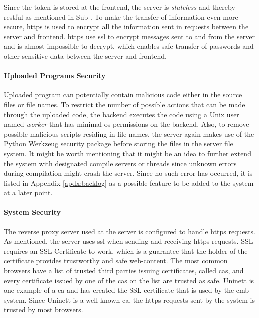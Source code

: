 Since the token is stored at the frontend, the server is \textit{stateless} and thereby \gls{rest}ful as mentioned in Sub-. To make the transfer of information even more secure, \gls{https} is used to encrypt all the information sent in requests between the server and frontend. \gls{https} use \gls{ssl} to encrypt messages sent to and from the server and is almost impossible to decrypt, which enables safe transfer of passwords and other sensitive data between the server and frontend.

\paragraph*{Uploaded Programs Security} Uploaded program can potentially contain malicious code either in the source files or file names. To restrict the number of possible actions that can be made through the uploaded code, the backend executes the code using a Unix user named \textit{worker} that has minimal \gls{os} permissions on the backend. Also, to remove possible malicious scripts residing in file names, the server again makes use of the Python Werkzeug security package \cite{WERKZEUG} before storing the files in the server file system. It might be worth mentioning that it might be an idea to further extend the system with designated compile servers or threads since unknown errors during compilation might crash the server. Since no such error has occurred, it is listed in Appendix \ref{apdx:backlog} as a possible feature to be added to the system at a later point.

\paragraph*{System Security} The reverse proxy server used at the server is configured to handle \gls{https} requests. As mentioned, the server uses \gls{ssl} when sending and receiving \gls{https} requests. SSL requires an SSL Certificate to work, which is a guarantee that the holder of the certificate provides trustworthy and safe web-content. The most common browsers have a list of trusted third parties issuing certificates, called \glspl{ca}, and every certificate issued by one of the \glspl{ca} on the list are trusted as safe. Uninett is one example of a \gls{ca} and has created the SSL certificate that is used by the \gls{cmb} system. Since Uninett is a well known \gls{ca}, the \gls{https} requests sent by the system is trusted by most browsers. \\

